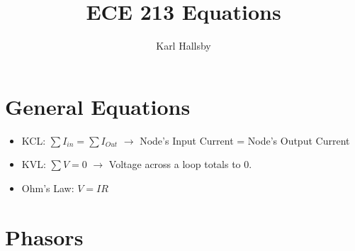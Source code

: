 \documentclass[10pt,letterpaper,final,twoside,notitlepage]{article}
\author{Karl Hallsby}
\title{ECE 213 Equations}
\begin{document}
\section*{General Equations}
	\begin{itemize}[noitemsep] %
		\item KCL: $\sum I_{in} = \sum I_{Out}$ $\rightarrow$ Node's Input Current = Node's Output Current
		\item KVL: $\sum V = 0$ $\rightarrow$ Voltage across a loop totals to 0.
		\item Ohm's Law: $V=IR$
	\end{itemize}

\section*{Phasors} \label{sec:Phasors}
\end{document}
